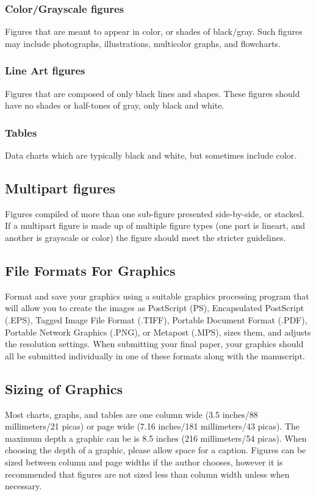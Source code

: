 \documentclass[journal]{IEEEtran}
\begin{document}
\subsubsection{Color/Grayscale figures}
{Figures that are meant to appear in color, or shades of black/gray. Such 
figures may include photographs, illustrations, multicolor graphs, and 
flowcharts.}

\subsubsection{Line Art figures}
{Figures that are composed of only black lines and shapes. These figures 
should have no shades or half-tones of gray, only black and white.}

\subsubsection{Tables}
{Data charts which are typically black and white, but sometimes include 
color.}



\subsection{Multipart figures}
Figures compiled of more than one sub-figure presented side-by-side, or 
stacked. If a multipart figure is made up of multiple figure
types (one part is lineart, and another is grayscale or color) the figure 
should meet the stricter guidelines.

\subsection{File Formats For Graphics}\label{formats}
Format and save your graphics using a suitable graphics processing program 
that will allow you to create the images as PostScript (PS), Encapsulated 
PostScript (.EPS), Tagged Image File Format (.TIFF), Portable Document 
Format (.PDF), Portable Network Graphics (.PNG), or Metapost (.MPS), sizes them, and adjusts 
the resolution settings. When 
submitting your final paper, your graphics should all be submitted 
individually in one of these formats along with the manuscript.

\subsection{Sizing of Graphics}
Most charts, graphs, and tables are one column wide (3.5 inches/88 
millimeters/21 picas) or page wide (7.16 inches/181 millimeters/43 
picas). The maximum depth a graphic can be is 8.5 inches (216 millimeters/54
picas). When choosing the depth of a graphic, please allow space for a 
caption. Figures can be sized between column and page widths if the author 
chooses, however it is recommended that figures are not sized less than 
column width unless when necessary. 
\end{document}
